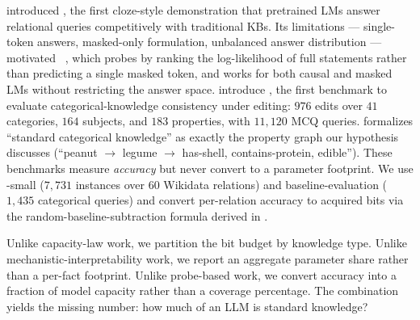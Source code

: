  \citet{petroni2019lama} introduced \lama, the first cloze-style demonstration that pretrained LMs answer relational queries competitively with traditional KBs. Its limitations --- single-token answers, masked-only formulation, unbalanced answer distribution --- motivated \bear~\citep{wiland2024bear}, which probes by ranking the log-likelihood of full statements rather than predicting a single masked token, and works for both causal and masked LMs without restricting the answer space. \citet{powell2024taxi} introduce \taxi, the first benchmark to evaluate categorical-knowledge consistency under editing: \(976\) edits over \(41\) categories, \(164\) subjects, and \(183\) properties, with \(11{,}120\) MCQ queries. \taxi formalizes ``standard categorical knowledge'' as exactly the property graph our hypothesis discusses (``peanut \(\to\) legume \(\to\) has-shell, contains-protein, edible''). These benchmarks measure \emph{accuracy} but never convert to a parameter footprint. We use \bear-small (\(7{,}731\) instances over \(60\) Wikidata relations) and \taxi baseline-evaluation (\(1{,}435\) categorical queries) and convert per-relation accuracy to acquired bits via the random-baseline-subtraction formula derived in .

 Unlike capacity-law work, we partition the bit budget by knowledge type. Unlike mechanistic-interpretability work, we report an aggregate parameter share rather than a per-fact footprint. Unlike probe-based work, we convert accuracy into a fraction of model capacity rather than a coverage percentage. The combination yields the missing number: how much of an LLM is standard knowledge?
